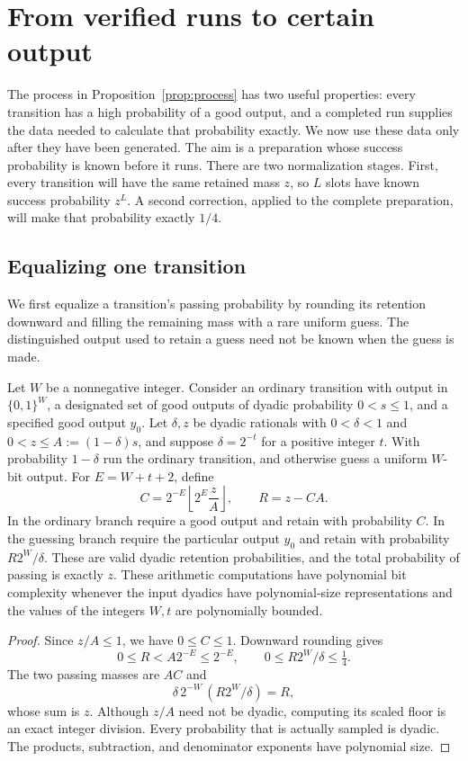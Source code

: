 \section{From verified runs to certain output}\label{sec:exactness}

The process in Proposition~\ref{prop:process} has two useful properties: every transition has a high probability of a good output, and a completed run supplies the data needed to calculate that probability exactly. We now use these data only after they have been generated. The aim is a preparation whose success probability is known before it runs. There are two normalization stages. First, every transition will have the same retained mass $z$, so $L$ slots have known success probability $z^L$. A second correction, applied to the complete preparation, will make that probability exactly $1/4$.

\subsection{Equalizing one transition}

We first equalize a transition's passing probability by rounding its retention downward and filling the remaining mass with a rare uniform guess. The distinguished output used to retain a guess need not be known when the guess is made.

\begin{lemma}\label{lem:completion}
Let $W$ be a nonnegative integer. Consider an ordinary transition with output in $\{0,1\}^W$, a designated set of good outputs of dyadic probability $0<s\le1$, and a specified good output $y_0$. Let $\delta,z$ be dyadic rationals with $0<\delta<1$ and $0<z\le A:=(1-\delta)s$, and suppose $\delta=2^{-t}$ for a positive integer $t$. With probability $1-\delta$ run the ordinary transition, and otherwise guess a uniform $W$-bit output. For $E=W+t+2$, define
\begin{equation}\label{eq:completion}
 C=2^{-E}\left\lfloor 2^E\frac{z}{A}\right\rfloor,
 \qquad R=z-CA.
\end{equation}
In the ordinary branch require a good output and retain with probability $C$. In the guessing branch require the particular output $y_0$ and retain with probability $R2^W/\delta$. These are valid dyadic retention probabilities, and the total probability of passing is exactly $z$. These arithmetic computations have polynomial bit complexity whenever the input dyadics have polynomial-size representations and the values of the integers $W,t$ are polynomially bounded.
\end{lemma}
\begin{proof}
Since $z/A\le1$, we have $0\le C\le1$. Downward rounding gives
\[
 0\le R<A2^{-E}\le2^{-E},
 \qquad 0\le R2^W/\delta\le\tfrac14.
\]
The two passing masses are $AC$ and
\[
 \delta\,2^{-W}\,(R2^W/\delta)=R,
\]
whose sum is $z$. Although $z/A$ need not be dyadic, computing its scaled floor is an exact integer division. Every probability that is actually sampled is dyadic. The products, subtraction, and denominator exponents have polynomial size.
\end{proof}

